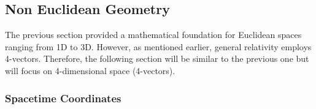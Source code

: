 \documentclass[a4paper,12pt]{extarticle}
\numberwithin{equation}{subsection}
\begin{document}
\subsection{Non Euclidean Geometry}
The previous section provided a mathematical foundation for Euclidean spaces ranging from 1D to 3D. However, as mentioned earlier, general relativity employs 4-vectors. Therefore, the following section will be similar to the previous one but will focus on 4-dimensional space (4-vectors).
\subsubsection{Spacetime Coordinates}





\newpage
\end{document}
